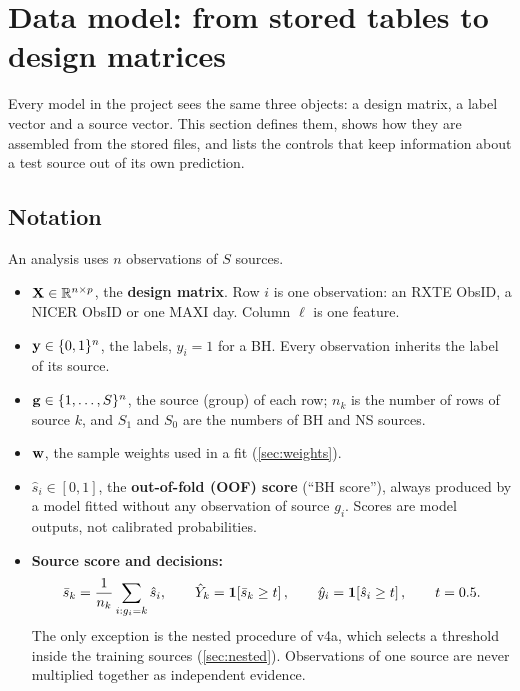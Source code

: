 \section{Data model: from stored tables to design matrices}\label{sec:datamodel}

Every model in the project sees the same three objects: a design matrix, a label vector and a source vector. This section
defines them, shows how they are assembled from the stored files, and lists the controls that keep information about a
test source out of its own prediction.

\subsection{Notation}\label{sec:notation}
An analysis uses $n$ observations of $S$ sources.
\begin{itemize}
\item $\mathbf{X}\in\mathbb R^{n\times p}$, the \textbf{design matrix}. Row $i$ is one observation: an RXTE ObsID, a NICER ObsID or
one MAXI day. Column $\ell$ is one feature.
\item $\mathbf{y}\in\{0,1\}^n$, the labels, $y_i=1$ for a BH. Every observation inherits the label of its source.
\item $\mathbf{g}\in\{1,\dots,S\}^n$, the source (group) of each row; $n_k$ is the number of rows of source $k$, and $S_1$ and $S_0$
are the numbers of BH and NS sources.
\item $\mathbf{w}$, the sample weights used in a fit (\cref{sec:weights}).
\item $\hat s_i\in[0,1]$, the \textbf{out-of-fold (OOF) score} (``BH score''), always produced by a model fitted without any
observation of source $g_i$. Scores are model outputs, not calibrated probabilities.
\item \textbf{Source score and decisions:}
\begin{equation}
\bar s_k=\frac1{n_k}\sum_{i:g_i=k}\hat s_i,\qquad\hat Y_k=\mathbf{1}\!\left[\bar s_k\ge t\right],\qquad\hat y_i=\mathbf{1}\!\left[\hat s_i\ge t\right],\qquad t=0.5.\label{eq:sourcescore}
\end{equation}
The only exception is the nested procedure of v4a, which selects a threshold inside the training sources
(\cref{sec:nested}). Observations of one source are never multiplied together as independent evidence.
\end{itemize}

